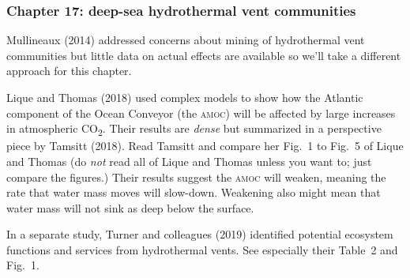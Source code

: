 \documentclass[12pt, addpoints]{exam}
\begin{document}
\begin{questions}

\subsubsection*{Chapter 17: deep-sea hydrothermal vent communities}

Mullineaux (2014) addressed concerns about mining of hydrothermal vent communities but little data on actual effects are available  so we'll take a different approach for this chapter. 

Lique and Thomas (2018) used complex models to show how the Atlantic component of the Ocean Conveyor (the \textsc{amoc}) will be affected by large increases in atmospheric CO\textsubscript{2}. Their results are \emph{dense} but summarized in a perspective piece by Tamsitt (2018).  Read Tamsitt and compare her Fig.~1 to Fig.~5 of Lique and Thomas (do \emph{not} read all of Lique and Thomas unless you want to; just compare the figures.) Their results suggest the \textsc{amoc} will weaken, meaning the rate that water mass moves will slow-down. Weakening also might mean that water mass will not sink as deep below the surface.

\question
In a separate study, Turner and colleagues (2019) identified potential ecosystem functions and services from hydrothermal vents. See especially their Table~2 and Fig.~1. 


\end{questions}
\end{document}
